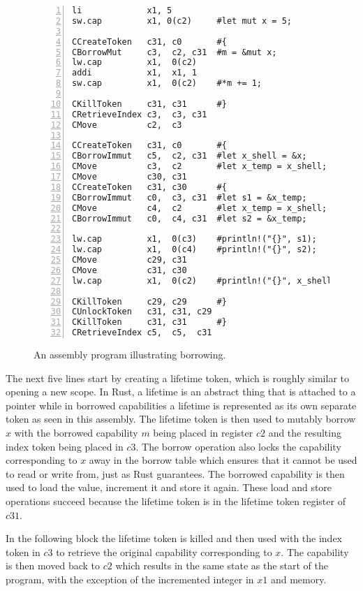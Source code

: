 \begin{figure}[h]
\begin{lstlisting}[style=custASM, numbers = left ,xleftmargin=1.5em]
li             x1, 5
sw.cap         x1, 0(c2)     #let mut x = 5;

CCreateToken   c31, c0       #{
CBorrowMut     c3,  c2, c31  #m = &mut x;
lw.cap         x1,  0(c2)
addi           x1,  x1, 1
sw.cap         x1,  0(c2)    #*m += 1;

CKillToken     c31, c31      #}
CRetrieveIndex c3,  c3, c31
CMove          c2,  c3

CCreateToken   c31, c0       #{
CBorrowImmut   c5,  c2, c31  #let x_shell = &x;
CMove          c3,  c2       #let x_temp = x_shell;
CMove          c30, c31
CCreateToken   c31, c30      #{
CBorrowImmut   c0,  c3, c31  #let s1 = &x_temp;
CMove          c4,  c2       #let x_temp = x_shell;
CBorrowImmut   c0,  c4, c31  #let s2 = &x_temp;

lw.cap         x1,  0(c3)    #println!("{}", s1);
lw.cap         x1,  0(c4)    #println!("{}", s2);
CMove          c29, c31
CMove          c31, c30
lw.cap         x1,  0(c2)    #println!("{}", x_shell);

CKillToken     c29, c29      #}
CUnlockToken   c31, c31, c29
CKillToken     c31, c31      #}
CRetrieveIndex c5,  c5,  c31
\end{lstlisting}
\caption{An assembly program illustrating borrowing.}
\label{fig:asmborrowexample}
\end{figure}

The next five lines start by creating a lifetime token, which is roughly similar to opening a new scope.
In Rust, a lifetime is an abstract thing that is attached to a pointer while in borrowed capabilities a lifetime is represented as its own separate token as seen in this assembly.
The lifetime token is then used to mutably borrow $x$ with the borrowed capability $m$ being placed in register $c2$ and the resulting index token being placed in $c3$.
The borrow operation also locks the capability corresponding to $x$ away in the borrow table which ensures that it cannot be used to read or write from, just as Rust guarantees.
The borrowed capability is then used to load the value, increment it and store it again.
These load and store operations succeed because the lifetime token is in the lifetime token register of $c31$.

In the following block the lifetime token is killed and then used with the index token in $c3$ to retrieve the original capability corresponding to $x$.
The capability is then moved back to $c2$ which results in the same state as the start of the program, with the exception of the incremented integer in $x1$ and memory.

